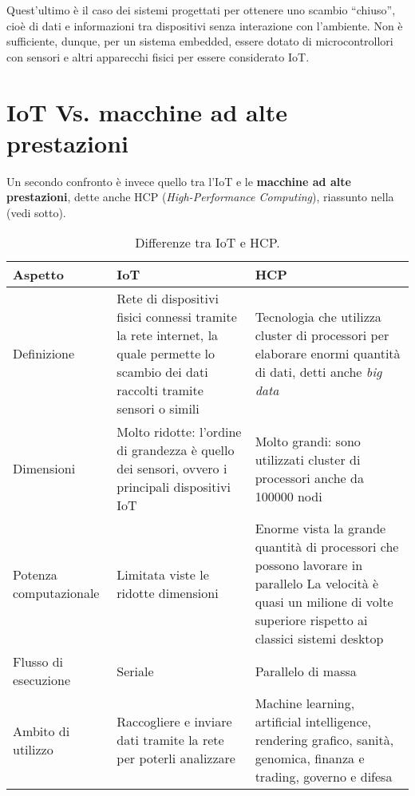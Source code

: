 \noindent Quest'ultimo è il caso dei sistemi progettati per ottenere uno scambio ``chiuso'', cioè di dati e informazioni tra dispositivi senza interazione con l’ambiente. Non è sufficiente, dunque, per un sistema embedded, essere dotato di microcontrollori con sensori e altri apparecchi fisici per essere considerato IoT\cite{iot-embedded}.

\section{IoT Vs. macchine ad alte prestazioni}

Un secondo confronto è invece quello tra l'IoT e le \textbf{macchine ad alte prestazioni}, dette anche HCP (\textit{High-Performance Computing})\cite{hcp}, riassunto nella  (vedi sotto).

\begin{table}[H]
    \centering
	\begin{tabular}{|m{}<{\centering}||m{}<{\centering}|m{}<{\centering}|}
		\hline
		\textbf{Aspetto} & \textbf{IoT} & \textbf{HCP} \\
        \hline \hline
        Definizione & Rete di dispositivi fisici connessi tramite la rete internet, la quale permette lo scambio dei dati raccolti tramite sensori o simili & Tecnologia che utilizza cluster di processori per elaborare enormi quantità di dati, detti anche \textit{big data} \\ 
        \hline
        Dimensioni & Molto ridotte: l'ordine di grandezza è quello dei sensori, ovvero i principali dispositivi IoT & Molto grandi: sono utilizzati cluster di processori anche da 100000 nodi \\
        \hline
        Potenza computazionale & Limitata viste le ridotte dimensioni & Enorme vista la grande quantità di processori che possono lavorare in parallelo La velocità è quasi un milione di volte superiore rispetto ai classici sistemi desktop \\
        \hline
        Flusso di esecuzione & Seriale & Parallelo di massa \\
        \hline
        Ambito di utilizzo & Raccogliere e inviare dati tramite la rete per poterli analizzare & Machine learning, artificial intelligence, rendering grafico, sanità, genomica, finanza e trading, governo e difesa \\
		\hline
    \end{tabular}
    \caption{Differenze tra IoT e HCP.}
    \label{tab: tabella_iot_hcp}
\end{table}

